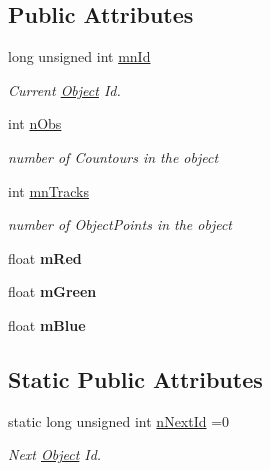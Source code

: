 \subsection*{Public Attributes}
\begin{DoxyCompactItemize}
\item 
\mbox{\label{classObject_ab70072eb97a2eb29253c2fd3f329fd29}} 
long unsigned int \hyperlink{classObject_ab70072eb97a2eb29253c2fd3f329fd29}{mn\+Id}
\begin{DoxyCompactList}\small\item\em Current \hyperlink{classObject}{Object} Id. \end{DoxyCompactList}\item 
\mbox{\label{classObject_ab066f4ba169bd2879bcb8eddcb8b3d66}} 
int \hyperlink{classObject_ab066f4ba169bd2879bcb8eddcb8b3d66}{n\+Obs}
\begin{DoxyCompactList}\small\item\em number of Countours in the object \end{DoxyCompactList}\item 
\mbox{\label{classObject_aa7c1b54a6cbaa078bc42d2bfd8cd3ab4}} 
int \hyperlink{classObject_aa7c1b54a6cbaa078bc42d2bfd8cd3ab4}{mn\+Tracks}
\begin{DoxyCompactList}\small\item\em number of Object\+Points in the object \end{DoxyCompactList}\item 
\mbox{\label{classObject_a44e0ae2123a49d8cabbdb5899a26ab33}} 
float {\bfseries m\+Red}
\item 
\mbox{\label{classObject_a4ebfd930ce71fb5b17fa2f2c2be8addb}} 
float {\bfseries m\+Green}
\item 
\mbox{\label{classObject_a3d953a4509afe458053efc9d46cc5a9f}} 
float {\bfseries m\+Blue}
\end{DoxyCompactItemize}
\subsection*{Static Public Attributes}
\begin{DoxyCompactItemize}
\item 
\mbox{\label{classObject_a3d8629d7d3aaeb68de1a5582260d7537}} 
static long unsigned int \hyperlink{classObject_a3d8629d7d3aaeb68de1a5582260d7537}{n\+Next\+Id} =0
\begin{DoxyCompactList}\small\item\em Next \hyperlink{classObject}{Object} Id. \end{DoxyCompactList}\end{DoxyCompactItemize}

